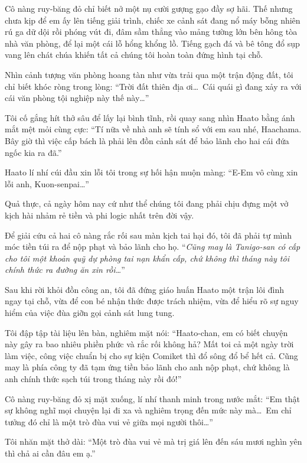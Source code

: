 \documentclass[../main.tex]{subfiles}
\begin{document}
Cô nàng ruy-băng đỏ chỉ biết nở một nụ cười gượng gạo đầy sợ hãi. Thế nhưng chưa kịp để em ấy lên tiếng giải trình, chiếc xe cảnh sát đang nổ máy bỗng nhiên rú ga dữ dội rồi phóng vút đi, đâm sầm thẳng vào mảng tường lớn bên hông tòa nhà văn phòng, để lại một cái lỗ hổng khổng lồ. Tiếng gạch đá và bê tông đổ sụp vang lên chát chúa khiến tất cả chúng tôi hoàn toàn đứng hình tại chỗ.

Nhìn cảnh tượng văn phòng hoang tàn như vừa trải qua một trận động đất, tôi chỉ biết khóc ròng trong lòng:
``Trời đất thiên địa ơi\dots\ Cái quái gì đang xảy ra với cái văn phòng tội nghiệp này thế này\dots''

Tôi cố gắng hít thở sâu để lấy lại bình tĩnh, rồi quay sang nhìn Haato bằng ánh mắt mệt mỏi cùng cực:
``Tí nữa về nhà anh sẽ tính sổ với em sau nhé, Haachama. Bây giờ thì việc cấp bách là phải lên đồn cảnh sát để bảo lãnh cho hai cái đứa ngốc kia ra đã.''

Haato lí nhí cúi đầu xin lỗi tôi trong sự hối hận muộn màng:
``E-Em vô cùng xin lỗi anh, Kuon-senpai\dots''

Quả thực, cả ngày hôm nay cứ như thể chúng tôi đang phải chịu đựng một vở kịch hài nhảm rẻ tiền và phi logic nhất trên đời vậy.

\ct

Để giải cứu cả hai cô nàng rắc rối sau màn kịch tai hại đó, tôi đã phải tự mình móc tiền túi ra để nộp phạt và bảo lãnh cho họ. ``\textit{Cũng may là Tanigo-san có cấp cho tôi một khoản quỹ dự phòng tai nạn khẩn cấp, chứ không thì tháng này tôi chính thức ra đường ăn xin rồi\dots}''

Sau khi rời khỏi đồn công an, tôi đã đứng giáo huấn Haato một trận lôi đình ngay tại chỗ, vừa để con bé nhận thức được trách nhiệm, vừa để hiểu rõ sự nguy hiểm của việc đùa giỡn gọi cảnh sát lung tung.

Tôi đập tập tài liệu lên bàn, nghiêm mặt nói:
``Haato-chan, em có biết chuyện này gây ra bao nhiêu phiền phức và rắc rối không hả? Mất toi cả một ngày trời làm việc, công việc chuẩn bị cho sự kiện Comiket thì đổ sông đổ bể hết cả. Cũng may là phía công ty đã tạm ứng tiền bảo lãnh cho anh nộp phạt, chứ không là anh chính thức sạch túi trong tháng này rồi đó!''

Cô nàng ruy-băng đỏ xị mặt xuống, lí nhí thanh minh trong nước mắt:
``Em thật sự không nghĩ mọi chuyện lại đi xa và nghiêm trọng đến mức này mà\dots\ Em chỉ tưởng đó chỉ là một trò đùa vui vẻ giữa mọi người thôi\dots''

Tôi nhăn mặt thở dài:
``Một trò đùa vui vẻ mà trị giá lên đến sáu mươi nghìn yên thì chả ai cần đâu em ạ.''
\end{document}
